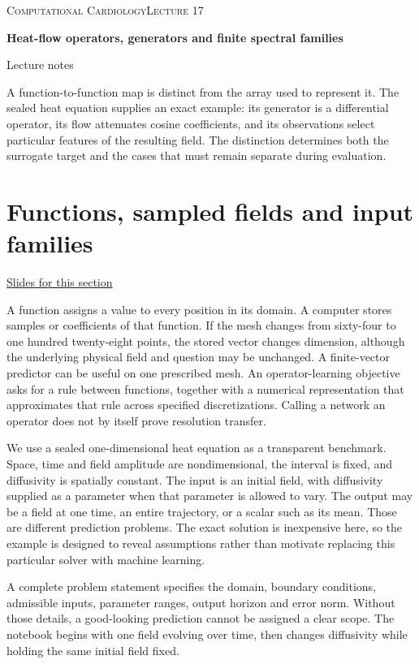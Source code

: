 \documentclass[11pt,letterpaper]{article}
\theoremstyle{definition}\newtheorem{definition}{Definition}\newtheorem{example}{Example}
\numberwithin{equation}{section}
\begin{document}
{\small\scshape Computational Cardiology\hfill Lecture 17}\par\medskip
{\raggedright{}\LARGE\bfseries\color{ink} Heat-flow operators, generators and finite spectral families\par}\medskip
{\small Lecture notes}\par\bigskip
A function-to-function map is distinct from the array used to represent it. The sealed heat equation supplies an exact example: its generator is a differential operator, its flow attenuates cosine coefficients, and its observations select particular features of the resulting field. The distinction determines both the surrogate target and the cases that must remain separate during evaluation.

\section{Functions, sampled fields and input families}
\hypertarget{note-functions-sampled-fields-and-input-families}{}\label{note:functions-sampled-fields-and-input-families}
{\small \href{slides.html\#frame=a-function-and-its-representation-panel-1\&step=1}{Slides for this section}}\par
A function assigns a value to every position in its domain. A computer stores samples or coefficients of that function. If the mesh changes from sixty-four to one hundred twenty-eight points, the stored vector changes dimension, although the underlying physical field and question may be unchanged. A finite-vector predictor can be useful on one prescribed mesh. An operator-learning objective asks for a rule between functions, together with a numerical representation that approximates that rule across specified discretizations. Calling a network an operator does not by itself prove resolution transfer.

We use a sealed one-dimensional heat equation as a transparent benchmark. Space, time and field amplitude are nondimensional, the interval is fixed, and diffusivity is spatially constant. The input is an initial field, with diffusivity supplied as a parameter when that parameter is allowed to vary. The output may be a field at one time, an entire trajectory, or a scalar such as its mean. Those are different prediction problems. The exact solution is inexpensive here, so the example is designed to reveal assumptions rather than motivate replacing this particular solver with machine learning.

A complete problem statement specifies the domain, boundary conditions, admissible inputs, parameter ranges, output horizon and error norm. Without those details, a good-looking prediction cannot be assigned a clear scope. The notebook begins with one field evolving over time, then changes diffusivity while holding the same initial field fixed.
\end{document}
